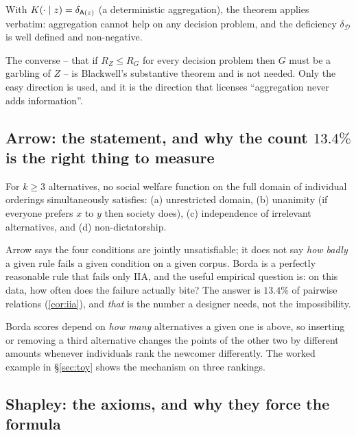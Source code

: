 \begin{corollary}
With $K(\cdot\mid z)=\delta_{\mathsf{A}(z)}$ (a deterministic aggregation), the theorem
applies verbatim: aggregation cannot help on any decision problem, and the
deficiency $\delta_{\mathcal{D}}$ is well defined and non-negative.
\end{corollary}

\begin{remark}
The converse -- that if $R_Z \le R_G$ for every decision problem then $G$ must be
a garbling of $Z$ -- is Blackwell's substantive theorem and is not needed. Only
the easy direction is used, and it is the direction that licenses
``aggregation never adds information''.
\end{remark}

\subsection{Arrow: the statement, and why the count $13.4\%$ is the right thing to measure}

\begin{theorem}
For $k \ge 3$ alternatives, no social welfare function on the full domain of
individual orderings simultaneously satisfies: (a) unrestricted domain,
(b) unanimity (if everyone prefers $x$ to $y$ then society does), (c)
independence of irrelevant alternatives, and (d) non-dictatorship.
\end{theorem}

 Arrow says the four
conditions are jointly unsatisfiable; it does not say \emph{how badly} a given
rule fails a given condition on a given corpus. Borda is a perfectly reasonable
rule that fails only IIA, and the useful empirical question is: on this data, how
often does the failure actually bite? The answer is $13.4\%$ of pairwise
relations (\cref{cor:iia}), and \emph{that} is the number a designer needs, not
the impossibility.

 Borda scores depend on \emph{how
many} alternatives a given one is above, so inserting or removing a third
alternative changes the points of the other two by different amounts whenever
individuals rank the newcomer differently. The worked example in §\ref{sec:toy}
shows the mechanism on three rankings.

\subsection{Shapley: the axioms, and why they force the formula}

